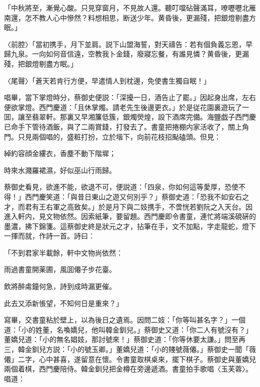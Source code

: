 \begin{myquote}
「中秋將至，漸覺心酸。只見穿窗月，不見故人還。聽叮噹砧聲滿耳，嘹嚦嚦北雁南還，怎不教人心中慘然？料想相思，断送少年。黄昏後，更漏殘，把銀燈剔盡方眠。」

{\markfont〈前腔〉}「當初携手，月下並肩。説下山盟海誓，對天禱告：若有個負義忘恩，早歸九泉。一向如何音信遠，空教我卜金錢，廢寢忘餐，有誰見憐？黄昏後，更漏殘，把銀燈剔盡方眠。」

{\markfont〈尾聲〉}「蒼天若肯行方便，早遣情人到枕邊，免使書生獨自眠！」
\end{myquote}

唱畢，當下掌燈時分，蔡御史便説：「深擾一日，酒告止了罷。」因起身出席，左右便欲掌燈。西門慶道：「且休掌燭。請老先生後邊更衣。」於是従花園裏遊玩了一囬，讓至翡翠軒。那裏又早湘簾低簇，銀燭熒煌，設下酒席完備。海鹽戯子西門慶已命手下管待酒飯，與了二兩賞錢，打發去了。書童把捲棚内家活收了，關上角門。只見兩個唱的，盛粧打扮，立於堦下，向前花枝招颭磕頭。但見：

\begin{myquote}
綽約容顔金縷衣，香塵不動下階墀；

時來水濺羅裙濕，好似巫山行雨歸。
\end{myquote}

蔡御史看見，欲進不能，欲退不可，便説道：「四泉，你如何這等愛厚，恐使不得！」西門慶笑道：「與昔日東山之遊又何別乎？」蔡御史道：「恐我不如安石之才，而君有王右軍之高致矣。」於是月下與二妓携手，不啻恍若劉阮之入天台。因進入軒内，見文物依然。因索紙筆，要留題。西門慶即令書童，連忙將端溪硯硏的墨濃，拂下錦箋。這蔡御史終是狀元之才，拈筆在手，文不加點，字走龍蛇，燈下一揮而就，作詩一首。詩曰：

\begin{myquote}
「不到君家半載餘，軒中文物尚依然：

雨過書童開薬圃，風囬僊子步花臺。

飲將醉䖏鐘何急，詩到成時漏更催。

此去又添新悵望，不知何日是重來？」
\end{myquote}

寫畢，交書童粘於壁上，以為後日之遺焉。因問二妓：「你等叫甚名字？」一個道：「小的姓董，名喚嬌兒，他叫韓金釧兒。」蔡御史又道：「你二人有號沒有？」董嬌兒道：「小的無名娼妓，那討號來！」蔡御史道：「你等休要太謙。」問至再三，韓金釧兒方説：「小的號玉卿。」董嬌兒道：「小的賤號薇僊。」蔡御史一聞「薇僊」二字，心中甚喜，遂留意在懷。令書童取棋桌來，擺下棋子。蔡御史與董嬌兒兩個着棋，西門慶陪侍。韓金釧兒把金樽在旁邊遞酒。書童拍手歌唱〈玉芙蓉〉。唱道：

